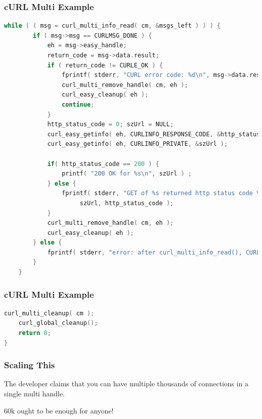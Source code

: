\begin{frame}[fragile]
	\frametitle{cURL Multi Example}

	\begin{lstlisting}[language=C]
    while ( ( msg = curl_multi_info_read( cm, &msgs_left ) ) ) {
        if ( msg->msg == CURLMSG_DONE ) {
            eh = msg->easy_handle;
            return_code = msg->data.result;
            if ( return_code != CURLE_OK ) {
                fprintf( stderr, "CURL error code: %d\n", msg->data.result );
                curl_multi_remove_handle( cm, eh );
                curl_easy_cleanup( eh );
                continue;
            }
            http_status_code = 0; szUrl = NULL;
            curl_easy_getinfo( eh, CURLINFO_RESPONSE_CODE, &http_status_code );
            curl_easy_getinfo( eh, CURLINFO_PRIVATE, &szUrl );

            if( http_status_code == 200 ) {
                printf( "200 OK for %s\n", szUrl ) ;
            } else {
                fprintf( stderr, "GET of %s returned http status code %d\n",
                     szUrl, http_status_code );
            }
            curl_multi_remove_handle( cm, eh );
            curl_easy_cleanup( eh );
        } else {
            fprintf( stderr, "error: after curl_multi_info_read(), CURLMsg=%d\n", msg->msg );
        }
    }
\end{lstlisting}

\end{frame}

\begin{frame}[fragile]
	\frametitle{cURL Multi Example}

	\begin{lstlisting}[language=C]
    curl_multi_cleanup( cm );
    curl_global_cleanup();
    return 0;
}
\end{lstlisting}

\end{frame}


\begin{frame}
	\frametitle{Scaling This}

	The developer claims that you can have multiple thousands of connections in a single multi handle.

	60k ought to be enough for anyone!
\end{frame}


